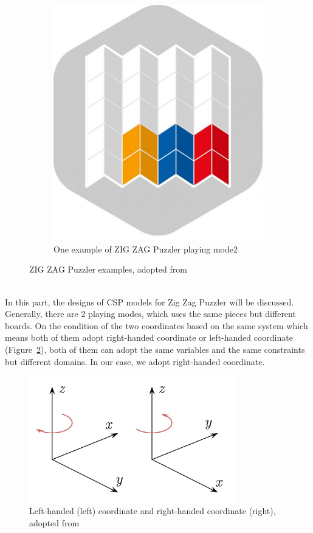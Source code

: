\begin{figure}[htbp]
\begin{subfigure}[b]{0.4\textwidth}
    \includegraphics[width=\textwidth]{figs/zig_zag_mode2.jpg}
    \caption{One example of ZIG ZAG Puzzler playing mode2}
    \end{subfigure}
    \caption{ZIG ZAG Puzzler examples, adopted from~\cite{r23}}
    \label{fig:ZIG_ZAG_Puzzler_playing_modes}
\end{figure}
\\In this part, the designs of CSP models for Zig Zag Puzzler will be discussed. Generally, there are 2 playing modes, which uses the same pieces but different boards. On the condition of the two coordinates based on the same system which means both of them adopt right-handed coordinate or left-handed coordinate (Figure~\ref{figure:Cartesiancoordinate}), both of them can adopt the same variables and the same constraints but different domains. In our case, we adopt right-handed coordinate. 
\begin{figure}[htbp]
    \centering
    \includegraphics[width=0.8\textwidth]{figs/Cartesian_coordinate_system_handedness}
    \caption{Left-handed (left) coordinate and right-handed coordinate (right), adopted from~\cite{r20}}
    \label{figure:Cartesiancoordinate}
\end{figure}
